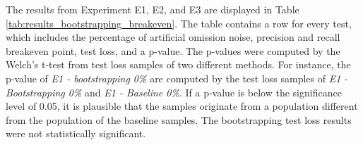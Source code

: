 The results from Experiment E1, E2, and E3 are displayed in Table \ref{tab:results_bootstrapping_breakeven}. The table contains a row for every test, which includes  the percentage of artificial omission noise, precision and recall breakeven point, test loss, and a p-value. The p-values were computed by the Welch's t-test from test loss samples of two different methods. For instance, the p-value of {\it E1 - bootstrapping 0\%} are computed by the test loss samples of {\it E1 - Bootstrapping 0\%} and {\it E1 - Baseline 0\%}.  If a p-value is below the significance level of 0.05, it is plausible that the samples originate from a population different from the population of the baseline samples. The bootstrapping test loss results were not statistically significant.\\



